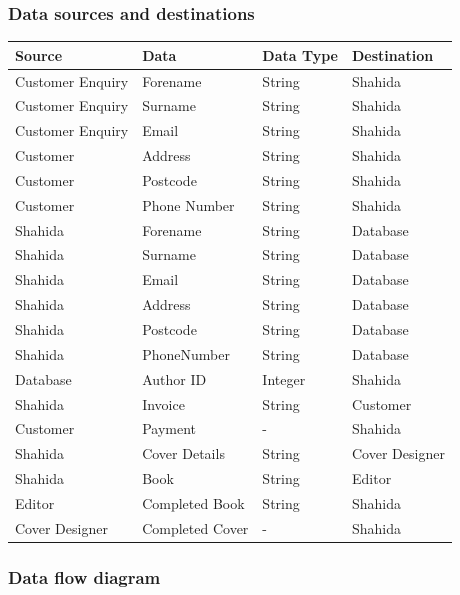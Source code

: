 \subsubsection{Data sources and destinations}
\begin{center}
\begin{tabular}{|p{2.5cm}|p{3.5cm}|p{3.5cm}|p{2.5cm}|}
    \hline
    \textbf{Source} & \textbf{Data} & \textbf{Data Type} & \textbf{Destination} \\ \hline
    Customer Enquiry & Forename & String & Shahida  \\ \hline
    Customer Enquiry & Surname & String & Shahida  \\ \hline
    Customer Enquiry & Email & String & Shahida  \\ \hline
    Customer & Address & String & Shahida  \\ \hline
    Customer & Postcode & String & Shahida  \\ \hline
    Customer & Phone Number & String & Shahida  \\ \hline
    Shahida & Forename & String & Database  \\ \hline
    Shahida & Surname & String & Database  \\ \hline
    Shahida & Email & String & Database  \\ \hline
    Shahida & Address & String & Database  \\ \hline
    Shahida & Postcode & String & Database  \\ \hline
    Shahida & PhoneNumber & String & Database  \\ \hline
    Database & Author ID & Integer & Shahida  \\ \hline
    Shahida & Invoice & String & Customer  \\ \hline
    Customer & Payment & - & Shahida  \\ \hline
    Shahida & Cover Details & String & Cover Designer\\ \hline
    Shahida & Book & String & Editor  \\ \hline
    Editor & Completed Book & String & Shahida  \\ \hline
    Cover Designer & Completed Cover & - & Shahida \\ \hline
    \hline
\end{tabular}
\end{center}

\subsubsection{Data flow diagram}

